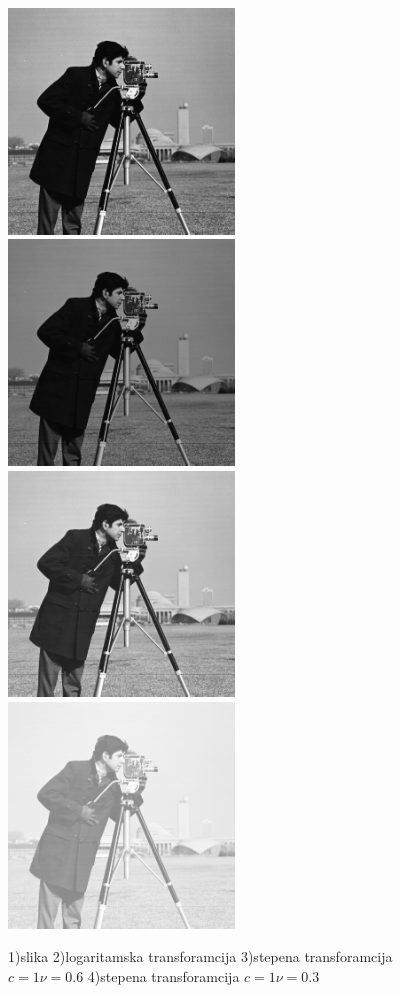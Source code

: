 \documentclass[a4paper,12pt,titlepage]{article}
\begin{document}
\begin{figure}[ht!]
\centering
\includegraphics[width=60mm]{img/img.png}
\includegraphics[width=60mm]{img/imgLog.png}
\includegraphics[width=60mm]{img/imgPow1.png}
\includegraphics[width=60mm]{img/imgPow2.png}
\caption{1)slika 2)logaritamska transforamcija 3)stepena transforamcija $c = 1 \nu = 0.6$ 4)stepena transforamcija $c = 1 \nu = 0.3$}
\label{overflow}
\end{figure} 
\end{document}
